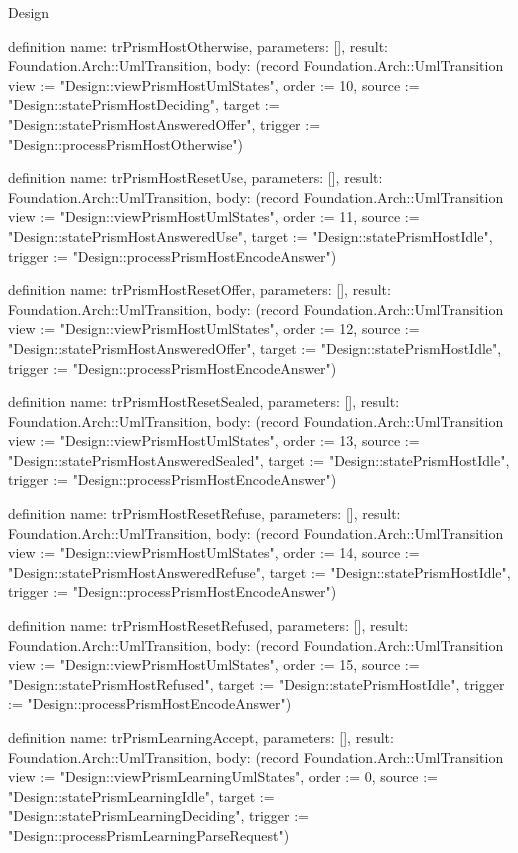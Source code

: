 \begin{lexlean}{Design}
\begin{semanticmodule}
definition{
  name: trPrismHostOtherwise,
  parameters: [],
  result: Foundation.Arch::UmlTransition,
  body: (record Foundation.Arch::UmlTransition {view := "Design::viewPrismHostUmlStates", order := 10, source := "Design::statePrismHostDeciding", target := "Design::statePrismHostAnsweredOffer", trigger := "Design::processPrismHostOtherwise"})
}

definition{
  name: trPrismHostResetUse,
  parameters: [],
  result: Foundation.Arch::UmlTransition,
  body: (record Foundation.Arch::UmlTransition {view := "Design::viewPrismHostUmlStates", order := 11, source := "Design::statePrismHostAnsweredUse", target := "Design::statePrismHostIdle", trigger := "Design::processPrismHostEncodeAnswer"})
}

definition{
  name: trPrismHostResetOffer,
  parameters: [],
  result: Foundation.Arch::UmlTransition,
  body: (record Foundation.Arch::UmlTransition {view := "Design::viewPrismHostUmlStates", order := 12, source := "Design::statePrismHostAnsweredOffer", target := "Design::statePrismHostIdle", trigger := "Design::processPrismHostEncodeAnswer"})
}

definition{
  name: trPrismHostResetSealed,
  parameters: [],
  result: Foundation.Arch::UmlTransition,
  body: (record Foundation.Arch::UmlTransition {view := "Design::viewPrismHostUmlStates", order := 13, source := "Design::statePrismHostAnsweredSealed", target := "Design::statePrismHostIdle", trigger := "Design::processPrismHostEncodeAnswer"})
}

definition{
  name: trPrismHostResetRefuse,
  parameters: [],
  result: Foundation.Arch::UmlTransition,
  body: (record Foundation.Arch::UmlTransition {view := "Design::viewPrismHostUmlStates", order := 14, source := "Design::statePrismHostAnsweredRefuse", target := "Design::statePrismHostIdle", trigger := "Design::processPrismHostEncodeAnswer"})
}

definition{
  name: trPrismHostResetRefused,
  parameters: [],
  result: Foundation.Arch::UmlTransition,
  body: (record Foundation.Arch::UmlTransition {view := "Design::viewPrismHostUmlStates", order := 15, source := "Design::statePrismHostRefused", target := "Design::statePrismHostIdle", trigger := "Design::processPrismHostEncodeAnswer"})
}

definition{
  name: trPrismLearningAccept,
  parameters: [],
  result: Foundation.Arch::UmlTransition,
  body: (record Foundation.Arch::UmlTransition {view := "Design::viewPrismLearningUmlStates", order := 0, source := "Design::statePrismLearningIdle", target := "Design::statePrismLearningDeciding", trigger := "Design::processPrismLearningParseRequest"})
}


\end{semanticmodule}
\end{lexlean}
